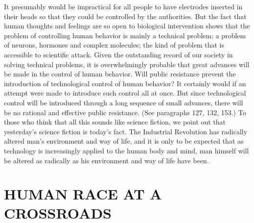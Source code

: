  It presumably would be impractical for all people to have electrodes inserted in their heads so that they could be controlled by the authorities. But the fact that human thoughts and feelings are so open to biological intervention shows that the problem of controlling human behavior is mainly a technical problem; a problem of neurons, hormones and complex molecules; the kind of problem that is accessible to scientific attack. Given the outstanding record of our society in solving technical problems, it is overwhelmingly probable that great advances will be made in the control of human behavior.\break
{} Will public resistance prevent the introduction of technological control of human behavior? It certainly would if an attempt were made to introduce such control all at once. But since technological control will be introduced through a long sequence of small advances, there will be no rational and effective public resistance. (See paragraphs 127, 132, 153.)
 To those who think that all this sounds like science fiction, we point out that yesterday’s science fiction is today’s fact. The Industrial Revolution has radically altered man’s environment and way of life, and it is only to be expected that as technology is increasingly applied to the human body and mind, man himself will be altered as radically as his environment and way of life have been.

\chapter{HUMAN RACE AT A CROSSROADS}

